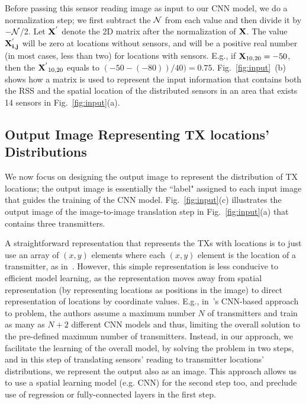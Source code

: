 Before passing this sensor reading image as input to our CNN model, we do a normalization step; we first subtract the $\cal{N}$ from each value and then divide it by $-\cal{N}$/2.
Let $\mathbf{X^{'}}$ denote the 2D matrix after the normalization of $\mathbf{X}$. 
The value $\mathbf{X^{'}_{i,j}}$ will be zero at locations without sensors, and \mxxij will be a positive real number (in most cases, less than two) for locations with sensors. E.g., if $\mathbf{X}_{10, 20}=-50$, then the 
$\mathbf{X^{'}}_{10, 20}$ equals to $(-50- (-80)) / 40) = 0.75$.
Fig.~\ref{fig:input}~(b) shows how a matrix is used to represent the input information that contains both the RSS and the spatial location of the distributed sensors in an area that exists 14 sensors in Fig.~\ref{fig:input}(a).






\subsection{\bf Output Image Representing TX locations' Distributions}
\label{subsec:imgimg_output_image}
We now focus on designing the output image to represent the distribution of TX locations; 
the output image is essentially the ``label" assigned to each input image that guides the training of the CNN model. 
Fig.~\ref{fig:input}(c) illustrates the output image of the image-to-image translation step in Fig.~\ref{fig:input}(a) that contains three transmitters.

A straightforward representation that represents the TXs with locations is to just
use an array of $(x, y)$ elements where each $(x, y)$ element is the location of a 
transmitter, as in~\cite{icccn20-deeptxfinder}.
However, this simple representation is less conducive to efficient model learning,
as the representation moves away from spatial representation (by representing locations 
as positions in the image) to direct representation of locations by coordinate values.
E.g., in~\cite{icccn20-deeptxfinder}'s CNN-based approach to \mtl problem, the authors
assume a maximum number $N$ of transmitters and train as many as $N+2$ different CNN models
and thus, limiting the overall solution to the pre-defined maximum number of 
transmitters.
Instead, in our approach, we facilitate the learning of the overall model, by solving the
\mtl problem in two steps, and in this step of translating sensors' reading
to transmitter locations' distributions, we represent the output also as an image.
This approach allows us to use a spatial learning model (e.g. CNN) for the second step too, and preclude
use of regression or fully-connected layers in the first step. 

